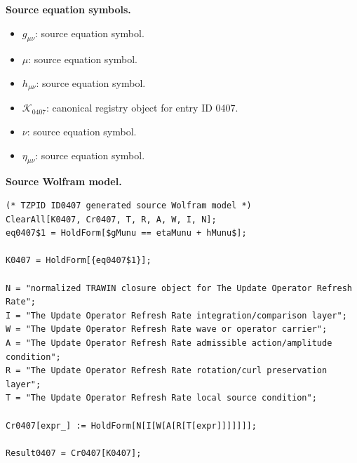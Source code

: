 \begin{minipage}[t]{0.49\linewidth}
\begingroup
\small
\raggedright
\textbf{Source equation symbols.}\par
\begin{itemize}[leftmargin=1.35em,itemsep=1pt,topsep=1pt,parsep=0pt]
    \item $g_{\mu\nu}$: source equation symbol.
    \item $\mu$: source equation symbol.
    \item $h_{\mu\nu}$: source equation symbol.
    \item $\mathcal{K}_{0407}$: canonical registry object for entry ID 0407.
    \item $\nu$: source equation symbol.
    \item $\eta_{\mu\nu}$: source equation symbol.
\end{itemize}
\endgroup
\end{minipage}\hfill
\begin{minipage}[t]{0.47\linewidth}
\begingroup
\scriptsize
\raggedright
\textbf{Source Wolfram model.}\par
\begin{Verbatim}[fontsize=\tiny,breaklines=true,breakanywhere=true]
(* TZPID ID0407 generated source Wolfram model *)
ClearAll[K0407, Cr0407, T, R, A, W, I, N];
eq0407$1 = HoldForm[$gMunu == etaMunu + hMunu$];

K0407 = HoldForm[{eq0407$1}];

N = "normalized TRAWIN closure object for The Update Operator Refresh Rate";
I = "The Update Operator Refresh Rate integration/comparison layer";
W = "The Update Operator Refresh Rate wave or operator carrier";
A = "The Update Operator Refresh Rate admissible action/amplitude condition";
R = "The Update Operator Refresh Rate rotation/curl preservation layer";
T = "The Update Operator Refresh Rate local source condition";

Cr0407[expr_] := HoldForm[N[I[W[A[R[T[expr]]]]]]];

Result0407 = Cr0407[K0407];
\end{Verbatim}
\endgroup
\end{minipage}


